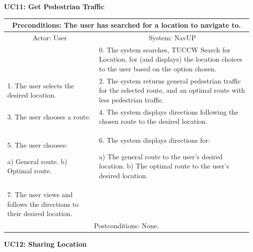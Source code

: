 ﻿\documentclass{article}
\begin{document}
				\vspace{5mm}
                \begin{flushleft}
                \textbf{UC11: Get Pedestrian Traffic}\\
                \end{flushleft}
        		\centering		
       		 \small
       		 \begin{tabular}{|p{6cm}|p{6cm}|}
       		 \hline
       		\multicolumn{2}{c}{ Preconditions: The user has searched for a location to navigate to.} \\
       		 \hline
       		\multicolumn{1}{c}{Actor: User} & \multicolumn{1}{c}{ System: NavUP} \\
        		\hline
       		  & 0.	The system searches, TUCCW Search for Location, for (and displays) the location choices to the user based on the option chosen.\\
       		 \hline
       		 1.	The user selects the desired location. & 2.	The system returns general pedestrian traffic for the selected route, and an optimal route with less pedestrian traffic.\\
        		\hline
       		 3.	The user chooses a route. & 4.	The system displays directions following the chosen route to the desired location.\\
        		\hline
       		 5.	The user chooses:

						a)	General route.
						b)	Optimal route.
			 & 6.	The system displays directions for:

					a)	The general route to the user's desired location.
					b)	The optimal route to the user's desired location.
 \\
        		\hline
        		7.	The user views and follows the directions to their desired location. & \\
       		 \hline
        		\multicolumn{2}{c}{Postconditions: None.} \\
        		\hline
        \end{tabular} 
\newpage
				\vspace{5mm}
                \begin{flushleft}
                \textbf{UC12: Sharing Location}\\
                \end{flushleft}
        		\centering		
       		 \small
\end{document}
